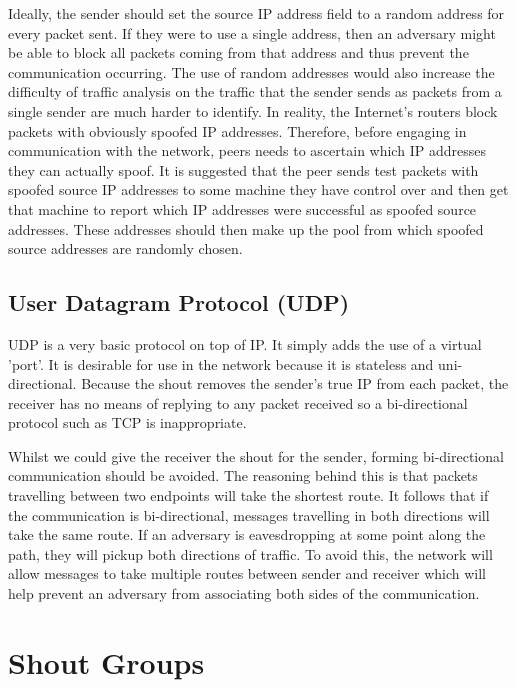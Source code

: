 \documentclass[ %
                    author={Luke Murray},
                supervisor={Dr. Simon Hollis},
                     title={Shadow Peer-to-Peer Networks},
                  subtitle={},
                    degree={MEng},
                      year={2013} ]{thesis}
\begin{document}
Ideally, the sender should set the source IP address field to a random address for every packet sent. If they were to use a single address, then an adversary might be able to block all packets coming from that address and thus prevent the communication occurring. The use of random addresses would also increase the difficulty of traffic analysis on the traffic that the sender sends as packets from a single sender are much harder to identify. In reality, the Internet's routers block packets with obviously spoofed IP addresses. Therefore, before engaging in communication with the network, peers needs to ascertain which IP addresses they can actually spoof. It is suggested that the peer sends test packets with spoofed source IP addresses to some machine they have control over and then get that machine to report which IP addresses were successful as spoofed source addresses. These addresses should then make up the pool from which spoofed source addresses are randomly chosen.

\subsection{User Datagram Protocol (UDP)}

UDP is a very basic protocol on top of IP. It simply adds the use of a virtual 'port'. It is desirable for use in the network because it is stateless and uni-directional. Because the shout removes the sender's true IP from each packet, the receiver has no means of replying to any packet received so a bi-directional protocol such as TCP is inappropriate.

Whilst we could give the receiver the shout for the sender, forming bi-directional communication should be avoided. The reasoning behind this is that packets travelling between two endpoints will take the shortest route. It follows that if the communication is bi-directional, messages travelling in both directions will take the same route. If an adversary is eavesdropping at some point along the path, they will pickup both directions of traffic. To avoid this, the network will allow messages to take multiple routes between sender and receiver which will help prevent an adversary from associating both sides of the communication.

\section{Shout Groups}
\label{sec:shout_groups}
\end{document}
